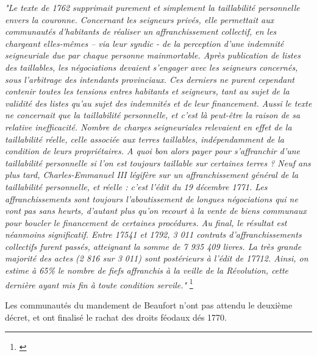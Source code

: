 \documentclass[a4paper,twoside,openany]{article}
\begin{document}
\textit{"Le texte de 1762 supprimait purement et simplement la taillabilité personnelle envers la
couronne. Concernant les seigneurs privés, elle permettait aux communautés d’habitants de
réaliser un affranchissement collectif, en les chargeant elles-mêmes – via leur syndic - de la
perception d’une indemnité seigneuriale due par chaque personne mainmortable. Après
publication de listes des taillables, les négociations devaient s’engager avec les seigneurs
concernés, sous l’arbitrage des intendants provinciaux. Ces derniers ne purent cependant
contenir toutes les tensions entres habitants et seigneurs, tant au sujet de la validité des listes
qu’au sujet des indemnités et de leur financement. Aussi le texte ne concernait que la taillabilité
personnelle, et c’est là peut-être la raison de sa relative inefficacité. Nombre de charges
seigneuriales relevaient en effet de la taillabilité réelle, celle associée aux terres taillables,
indépendamment de la condition de leurs propriétaires. A quoi bon alors payer pour s’affranchir
d’une taillabilité personnelle si l’on est toujours taillable sur certaines terres ?
Neuf ans plus tard, Charles-Emmanuel III légifère sur un affranchissement général de la
taillabilité personnelle, et réelle : c’est l’édit du 19 décembre 1771. Les affranchissements sont
toujours l’aboutissement de longues négociations qui ne vont pas sans heurts, d’autant plus
qu’on recourt à la vente de biens communaux pour boucler le financement de certaines
procédures. Au final, le résultat est néanmoins significatif. Entre 17541 et 1792, 3 011 contrats
d’affranchissements collectifs furent passés, atteignant la somme de 7 935 409 livres. La très
grande majorité des actes (2 816 sur 3 011) sont postérieurs à l’édit de 17712. Ainsi, on estime
à 65\% le nombre de fiefs affranchis à la veille de la Révolution, cette dernière ayant mis fin à
toute condition servile."} \footnote{\cite{Gachet2022}}

Les communautés du mandement de Beaufort n'ont pas attendu le deuxième décret, et ont finalisé le rachat des droits féodaux dés 1770.
\end{document}

